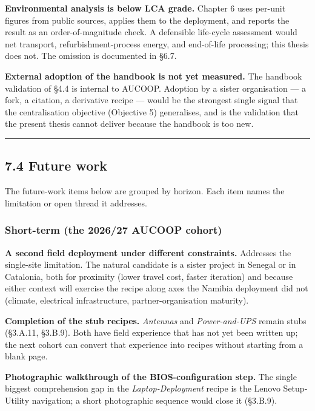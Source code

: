 \textbf{Environmental analysis is below LCA grade.} Chapter 6 uses
per-unit figures from public sources, applies them to the deployment,
and reports the result as an order-of-magnitude check. A defensible
life-cycle assessment would net transport, refurbishment-process energy,
and end-of-life processing; this thesis does not. The omission is
documented in §6.7.

\textbf{External adoption of the handbook is not yet measured.} The
handbook validation of §4.4 is internal to AUCOOP. Adoption by a sister
organisation --- a fork, a citation, a derivative recipe --- would be
the strongest single signal that the centralisation objective (Objective
5) generalises, and is the validation that the present thesis cannot
deliver because the handbook is too new.

\begin{center}\rule{0.5\linewidth}{0.5pt}\end{center}

\hypertarget{future-work}{%
\subsection{7.4 Future work}\label{future-work}}

The future-work items below are grouped by horizon. Each item names the
limitation or open thread it addresses.

\hypertarget{short-term-the-202627-aucoop-cohort}{%
\subsubsection{Short-term (the 2026/27 AUCOOP
cohort)}\label{short-term-the-202627-aucoop-cohort}}

\textbf{A second field deployment under different constraints.}
Addresses the single-site limitation. The natural candidate is a sister
project in Senegal or in Catalonia, both for proximity (lower travel
cost, faster iteration) and because either context will exercise the
recipe along axes the Namibia deployment did not (climate, electrical
infrastructure, partner-organisation maturity).

\textbf{Completion of the stub recipes.} \emph{Antennas} and
\emph{Power-and-UPS} remain stubs (§3.A.11, §3.B.9). Both have field
experience that has not yet been written up; the next cohort can convert
that experience into recipes without starting from a blank page.

\textbf{Photographic walkthrough of the BIOS-configuration step.} The
single biggest comprehension gap in the \emph{Laptop-Deployment} recipe
is the Lenovo Setup-Utility navigation; a short photographic sequence
would close it (§3.B.9).


